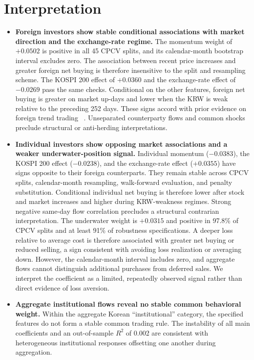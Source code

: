 \section{Interpretation}
\label{sec:interpretation}

\begin{itemize}
\item \textbf{Foreign investors show stable conditional associations with market direction
and the exchange-rate regime.} The momentum weight of $+0.0502$ is positive in all
45 CPCV splits, and its calendar-month bootstrap interval excludes zero. The association
between recent price increases and greater foreign net buying is therefore insensitive to
the split and resampling scheme. The KOSPI 200 effect of $+0.0360$ and the exchange-rate
effect of $-0.0269$ pass the same checks. Conditional on the other features, foreign
net buying is greater on market up-days and lower when the KRW is weak relative to the
preceding 252 days. These signs accord with prior evidence on foreign trend trading
~\cite{grinblatt2000investment,choe1999foreign}. Unseparated counterparty flows and common
shocks preclude structural or anti-herding interpretations.

\item \textbf{Individual investors show opposing market associations and a weaker
underwater-position signal.} Individual momentum ($-0.0383$), the KOSPI 200 effect
($-0.0238$), and the exchange-rate effect ($+0.0355$) have signs opposite to their
foreign counterparts. They remain stable across CPCV splits, calendar-month resampling,
walk-forward evaluation, and penalty substitution. Conditional individual net buying is
therefore lower after stock and market increases and higher during KRW-weakness regimes.
Strong negative same-day flow correlation precludes a structural contrarian interpretation.
The underwater weight is
$+0.0315$ and positive in 97.8\% of CPCV splits and at least 91\% of robustness
specifications. A deeper loss relative to average cost is therefore associated with greater
net buying or reduced selling, a sign consistent with avoiding loss realization or averaging
down. However, the calendar-month interval includes zero, and aggregate flows cannot
distinguish additional purchases from deferred sales. We interpret the coefficient as a
limited, repeatedly observed signal rather than direct evidence of loss aversion.

\item \textbf{Aggregate institutional flows reveal no stable common behavioral weight.}
Within the aggregate Korean ``institutional'' category, the specified features do not form
a stable common trading rule. The instability of all main coefficients and an
out-of-sample $R^2$ of 0.002
are consistent with heterogeneous institutional responses offsetting one another during
aggregation.
\end{itemize}

